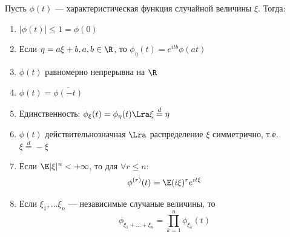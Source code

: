 \begin{lemma}
    Пусть \(\phi(t)\) --- характеристическая функция случайной величины \(\xi\). Тогда:
    \begin{enumerate}
        \item \(|\phi(t)| \le 1 = \phi(0)\)
        \item Если \(\eta = a\xi + b, a, b \in \R\), то \(\phi_\eta(t) = e^{itb}\phi(at)\)
        \item \(\phi(t)\) равномерно непрерывна на \(\R\)
        \item \(\phi(t) = \overline{\phi(-t)}\)
        \item Единственность: \(\phi_\xi(t) = \phi_\eta(t) \Lra \xi \stackrel{d}{=} \eta\)
        \item \(\phi(t)\) действительнозначная \(\Lra\) распределение \(\xi\) симметрично, т.е. \(\xi \stackrel{d}{=} -\xi\)
        \item Если \(\E|\xi|^n < +\infty\), то для \(\forall r \le n\):
        \[\phi^{(r)}(t) = \E(i\xi)^re^{it\xi}\]
        \item Если \(\xi_1, \dots \xi_n\) --- независимые случаные величины, то 
        \[\phi_{\xi_1 + \dots + \xi_n} = \prod_{k = 1}^n \phi_{\xi_k}(t)\]
    \end{enumerate}
\end{lemma}
